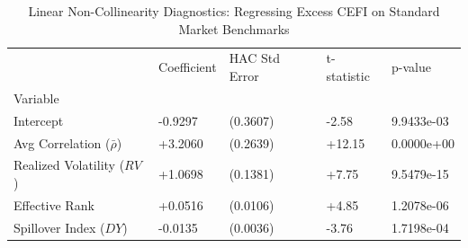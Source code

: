 \begin{table}
\caption{Linear Non-Collinearity Diagnostics: Regressing Excess CEFI on Standard Market Benchmarks}
\label{tab:collinearity}
\begin{tabular}{lllll}
\toprule
 & Coefficient & HAC Std Error & t-statistic & p-value \\
Variable &  &  &  &  \\
\midrule
Intercept & -0.9297 & (0.3607) & -2.58 & 9.9433e-03 \\
Avg Correlation ($\bar{\rho}$) & +3.2060 & (0.2639) & +12.15 & 0.0000e+00 \\
Realized Volatility ($RV$) & +1.0698 & (0.1381) & +7.75 & 9.5479e-15 \\
Effective Rank & +0.0516 & (0.0106) & +4.85 & 1.2078e-06 \\
Spillover Index ($DY$) & -0.0135 & (0.0036) & -3.76 & 1.7198e-04 \\
\bottomrule
\end{tabular}
\end{table}
